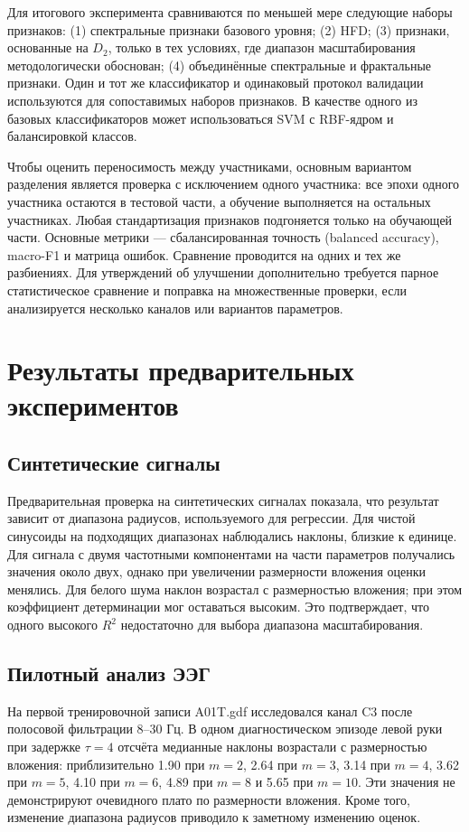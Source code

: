 Для итогового эксперимента сравниваются по меньшей мере следующие наборы признаков: (1) спектральные признаки базового уровня; (2) HFD; (3) признаки, основанные на $D_2$, только в тех условиях, где диапазон масштабирования методологически обоснован; (4) объединённые спектральные и фрактальные признаки. Один и тот же классификатор и одинаковый протокол валидации используются для сопоставимых наборов признаков. В качестве одного из базовых классификаторов может использоваться SVM с RBF-ядром и балансировкой классов.

Чтобы оценить переносимость между участниками, основным вариантом разделения является проверка с исключением одного участника: все эпохи одного участника остаются в тестовой части, а обучение выполняется на остальных участниках. Любая стандартизация признаков подгоняется только на обучающей части. Основные метрики — сбалансированная точность (balanced accuracy), macro-F1 и матрица ошибок. Сравнение проводится на одних и тех же разбиениях. Для утверждений об улучшении дополнительно требуется парное статистическое сравнение и поправка на множественные проверки, если анализируется несколько каналов или вариантов параметров.

\section{Результаты предварительных экспериментов}

\subsection{Синтетические сигналы}

Предварительная проверка на синтетических сигналах показала, что результат зависит от диапазона радиусов, используемого для регрессии. Для чистой синусоиды на подходящих диапазонах наблюдались наклоны, близкие к единице. Для сигнала с двумя частотными компонентами на части параметров получались значения около двух, однако при увеличении размерности вложения оценки менялись. Для белого шума наклон возрастал с размерностью вложения; при этом коэффициент детерминации мог оставаться высоким. Это подтверждает, что одного высокого $R^2$ недостаточно для выбора диапазона масштабирования.

\subsection{Пилотный анализ ЭЭГ}

На первой тренировочной записи A01T.gdf исследовался канал C3 после полосовой фильтрации 8--30 Гц. В одном диагностическом эпизоде левой руки при задержке $\tau=4$ отсчёта медианные наклоны возрастали с размерностью вложения: приблизительно 1.90 при $m=2$, 2.64 при $m=3$, 3.14 при $m=4$, 3.62 при $m=5$, 4.10 при $m=6$, 4.89 при $m=8$ и 5.65 при $m=10$. Эти значения не демонстрируют очевидного плато по размерности вложения. Кроме того, изменение диапазона радиусов приводило к заметному изменению оценок.

